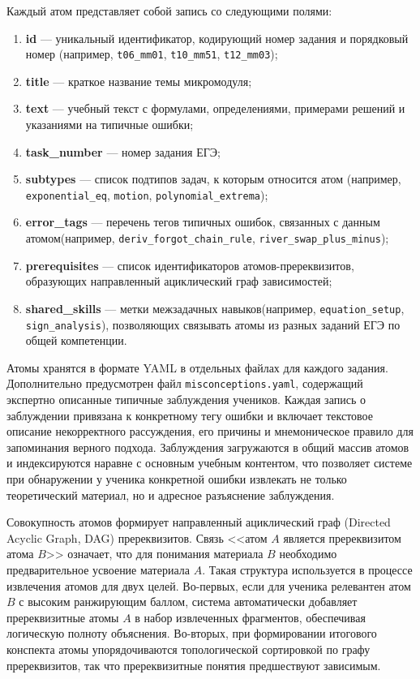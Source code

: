 \documentclass[a4paper,12pt]{extarticle}
\begin{document}
Каждый атом представляет собой запись со следующими полями:

\begin{enumerate}
    \item \textbf{id} --- уникальный идентификатор, кодирующий номер задания и
	порядковый номер (например, \texttt{t06\_mm01}, \texttt{t10\_mm51},
	\texttt{t12\_mm03});
    \item \textbf{title} --- краткое название темы микромодуля;
    \item \textbf{text} --- учебный текст с формулами, определениями, примерами
	решений и указаниями на типичные ошибки;
    \item \textbf{task\_number} --- номер задания ЕГЭ;
    \item \textbf{subtypes} --- список подтипов задач, к которым относится атом\newline
	(например, \texttt{exponential\_eq}, \texttt{motion},
	\texttt{polynomial\_extrema});
    \item \textbf{error\_tags} --- перечень тегов типичных ошибок, связанных с данным
	атомом\newline (например, \texttt{deriv\_forgot\_chain\_rule},
	\texttt{river\_swap\_plus\_minus});
    \item \textbf{prerequisites} --- список идентификаторов атомов-пререквизитов,
	образующих направленный ациклический граф зависимостей;
    \item \textbf{shared\_skills} --- метки межзадачных навыков\newline (например,
	\texttt{equation\_setup}, \texttt{sign\_analysis}), позволяющих связывать
	атомы из разных заданий ЕГЭ по общей компетенции.
\end{enumerate}

Атомы хранятся в формате YAML в отдельных файлах для каждого задания.
Дополнительно предусмотрен файл \texttt{misconceptions.yaml}, содержащий экспертно
описанные типичные заблуждения учеников. Каждая запись о заблуждении привязана
к конкретному тегу ошибки и включает текстовое описание некорректного рассуждения,
его причины и мнемоническое правило для запоминания верного подхода. Заблуждения
загружаются в общий массив атомов и индексируются наравне с основным учебным
контентом, что позволяет системе при обнаружении у ученика конкретной ошибки
извлекать не только теоретический материал, но и адресное разъяснение заблуждения.

Совокупность атомов формирует направленный ациклический граф (Directed Acyclic Graph, DAG) пререквизитов.
Связь <<атом $A$ является пререквизитом атома $B$>> означает, что для понимания
материала $B$ необходимо предварительное усвоение материала $A$. Такая структура
используется в процессе извлечения атомов для двух целей. Во-первых, если для ученика
релевантен атом $B$ с высоким ранжирующим баллом, система автоматически добавляет
пререквизитные атомы $A$ в набор извлеченных фрагментов, обеспечивая логическую
полноту объяснения. Во-вторых, при формировании итогового конспекта атомы
упорядочиваются топологической сортировкой по графу пререквизитов, так что
пререквизитные понятия предшествуют зависимым.
\end{document}
